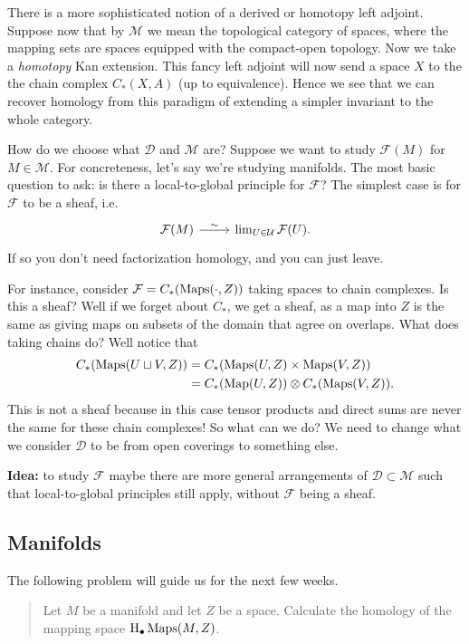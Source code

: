 \documentclass{amsart}
\begin{document}
There is a more sophisticated notion of a derived or homotopy left adjoint.
Suppose now that by $\mathcal{M}$
we mean the topological category of spaces, where the mapping sets are spaces equipped
with the compact-open topology. Now we take a \textit{homotopy} Kan extension. This
fancy left adjoint will now send a space $X$ to the the chain complex $C_*(X, A)$
(up to equivalence). Hence we see that we can recover homology from this paradigm
of extending a simpler invariant to the whole category.

How do we choose what $\mathcal{D}$ and $\mathcal{M}$ are? Suppose we want to study
$\mathcal{F}(M)$ for $M\in\mathcal{M}$. For concreteness, let's say we're studying
manifolds. The most basic question to ask: is there a local-to-global principle for
$\mathcal{F}$? The simplest case is for $\mathcal{F}$ to be a sheaf, i.e.
\begin{equation*}
    \begin{tikzcd}
        \mathcal{F}(M) \rar{\sim} & \lim_{U\in\mathcal{U}} \mathcal{F}(U).
    \end{tikzcd}
\end{equation*}
If so you don't need factorization homology, and you can just leave.

For instance, consider $\mathcal{F}=C_*(\operatorname{Maps}(\cdot, Z))$ taking spaces to chain
complexes. Is this a sheaf? Well if we forget about $C_*$, we get a sheaf, as a
map into $Z$ is the same as giving maps on subsets of the domain that agree on overlaps.
What does
taking chains do? Well notice that
\begin{align*}
    C_*(\operatorname{Maps}(U\sqcup V,Z)) &= C_*(\operatorname{Maps}(U,Z)\times\operatorname{Maps}(V,Z))\\
    &= C_*(\operatorname*{Map}(U,Z)) \otimes C_*(\operatorname{Maps}(V,Z)).
\end{align*}
This is not a sheaf because in this case tensor products and direct sums are never
the same for these chain complexes! 
So what can we do? We need to change what we consider $\mathcal{D}$ to be from
open coverings to something else.

\textbf{Idea:} to study $\mathcal{F}$ maybe there are more general arrangements of
$\mathcal{D}\subset\mathcal{M}$ such that local-to-global principles still apply, without
$\mathcal{F}$ being a sheaf.

\subsection{Manifolds}

The following problem will guide us for the next few weeks.
\begin{quote}
    Let $M$ be a manifold and let $Z$ be a space.
    Calculate the homology of the mapping space $\operatorname{H}_\bullet\operatorname{Maps}(M,Z)$.
\end{quote}
\end{document}
